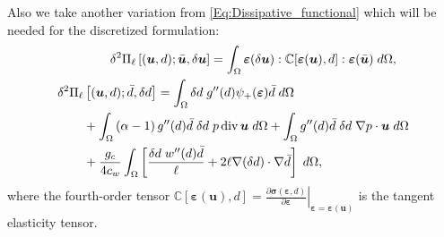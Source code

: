 Also we take another variation from \eqref{Eq:Dissipative_functional} which will be needed for the discretized formulation:
\begin{subequations}\label{Eq:Tangent}
\begin{align}\label{Eq:Tangent_u}
\begin{split}
        \delta^2 \Pi_\ell & \left[(\bm{u}, d); \bar{\bm{u}}, \delta \bm{u}\right]
        = \int_\Omega \bm{\varepsilon}(\delta\bm{u}): \mathbb{C}[\bm{\varepsilon}(\bm{u}), d] : \bm{\varepsilon}(\bar{\bm{u}})  \;d\Omega,
        \end{split}\\
        \begin{split}
	            \delta^2 \Pi_\ell & \left[(\bm{u}, d);  \bar{d},  \delta d\right]
	    =  \int_\Omega \delta d \;g''(d) \psi_+(\bm{\varepsilon}) \bar d \; d\Omega\\ 
	    & +\int_{\Omega} \left(\alpha-1\right) g''(d)\bar{d} \; \delta d \; {p} \operatorname{div} {{\bm{u}}} \; d\Omega +\int_{\Omega}  g''(d)\bar{d} \; \delta d \; \nabla {p} \cdot {{\bm{u}}} \; d\Omega 
	    \\& +
	    \frac{g_c}{4c_w} \int_\Omega  \left[\frac{\delta d \; w''(d) \bar{d}}{\ell} + 2\ell \nabla (\delta d) \cdot \nabla \bar d \right]\;d\Omega,
	    \end{split}
\end{align}
\end{subequations}
where the fourth-order tensor $\mathbb{C}[\bm{\varepsilon}(\bm{u}), d] = \left.\frac{\partial \bm{\sigma}(\bm{\varepsilon}, d)}{\partial \bm{\varepsilon}}\right|_{\bm{\varepsilon}=\bm{\varepsilon}(\bm{u})}$ is the tangent elasticity tensor.

